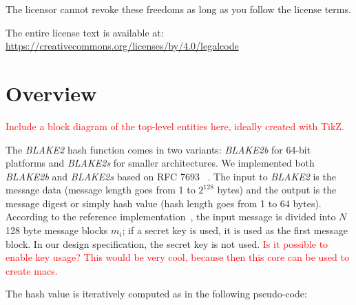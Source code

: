 \documentclass[%
	a4paper,
]
{article}
\newcommand{\todo}[1]{\textcolor{red}{#1}}
\begin{document}
The licensor cannot revoke these freedoms as long as you follow the license terms.

The entire license text is available at:
\href{https://creativecommons.org/licenses/by/4.0/legalcode}
	{https://creativecommons.org/licenses/by/4.0/legalcode}


\pagebreak
%
%
%
%
\section{Overview}
\label{sec:overview}

\todo{Include a block diagram of the top-level entities here, ideally
created with TikZ.}

The \emph{BLAKE2} hash function comes in two variants: \emph{BLAKE2b} for
64-bit platforms and \emph{BLAKE2s} for smaller architectures.
%
We implemented both \emph{BLAKE2b} and \emph{BLAKE2s} based on RFC 7693~%
\autocite{rfc7693}.	
%
The input to \emph{BLAKE2} is the message data (message
length goes from 1 to $2^{128}$ bytes) and the output is the message digest or
simply hash value (hash length goes from 1 to 64 bytes).
%
According to the reference implementation~\autocite{REF}, the input message is
divided into $N$ 128 byte message blocks $m_i$; if a secret key is used, it is
used as the first message block. In our design specification, the secret key is
not used. \todo{Is it possible to enable key usage? This would be very cool,
because then this core can be used to create \glspl{mac}.}

The hash value is iteratively computed as in the following pseudo-code:
\end{document}
